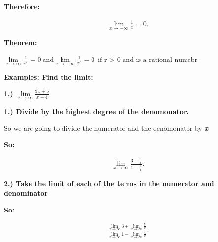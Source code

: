 \documentclass{report}
\begin{document}
        \bigbreak \noindent 
        \textbf{Therefore:}

        \begin{align*}
            \lim\limits_{x \to - \infty}{ \frac{1}{x} = 0}
        .\end{align*}

        \pagebreak \bigbreak \noindent
        \begin{large}
            \textbf{Theorem:}
        \end{large}

        \bigbreak \noindent 
        $\lim\limits_{x \to \infty}{ \frac{1}{x^r}} = 0\ \text{and} \lim\limits_{x \to - \infty}{ \frac{1}{x^r}} = 0\
        \text{if r $>$ 0 and is a rational numebr}$

        \bigbreak \noindent \bigbreak \noindent 
        \begin{large}
            \noindent \textbf{Examples: Find the limit:}
        \end{large}

        \bigbreak \noindent \bigbreak \noindent 
        \textbf{1.) $\lim\limits_{x \to \infty}{ \frac{3x+5}{x - 4}}$}

        \bigbreak \noindent \bigbreak \noindent 
        \textbf{1.) Divide by the highest degree of the denomonator.}
        
        \bigbreak \noindent \bigbreak \noindent 
        So we are going to divide the numerator and the denomonator by \textbf{\textit{x}}

        \bigbreak \noindent 
        \textbf{So:}

        \begin{align*}
            \lim\limits_{x \to \infty}{ \frac{3 + \frac{5}{x}}{1- \frac{4}{x}}}
        .\end{align*}

        \bigbreak \noindent \bigbreak \noindent 
        \textbf{2.) Take the limit of each of the terms in the numerator and denominator}

        \bigbreak \noindent 
        \textbf{So:}

        \begin{align*}
            \frac{ \lim\limits_{x \to \infty}{3} + \lim\limits_{x \to \infty}{ \frac{5}{x}}}{ \lim\limits_{x \to \infty}{1} - \lim\limits_{x \to \infty}{ \frac{4}{x}}}
        .\end{align*}
\end{document}
